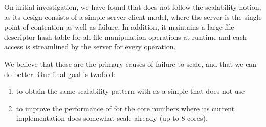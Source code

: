 On initial investigation, we have found that \fakeroot does not
follow the scalability notion, as its design consists of
a simple server-client model, where the server
is the single point of contention as well as failure.
In addition, it maintains a large file descriptor
hash table for all file manipulation operations at
runtime and each access is streamlined by the server
for every operation.

We believe that these are the primary
causes of failure to scale, and that we can do better.
Our final goal is twofold:
\begin{enumerate}
\item to obtain the same scalability pattern
  with \fakeroot as a simple
  \make that does not use \fakeroot
\item to improve the performance of \fakeroot for the core
  numbers where its current implementation does
  somewhat scale already (up to 8 cores).
\end{enumerate}

